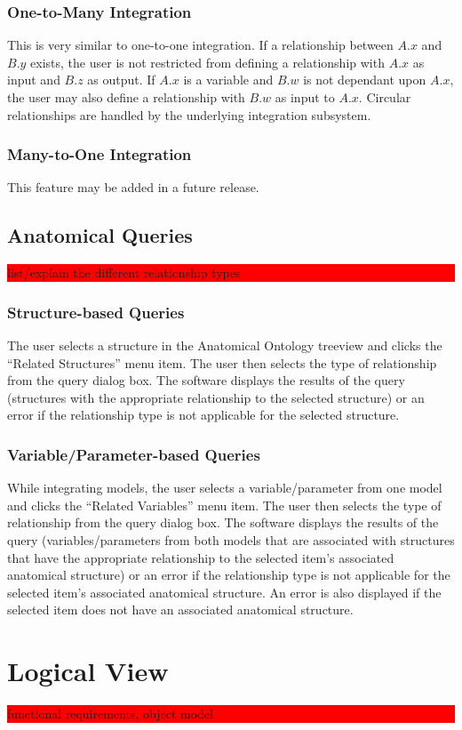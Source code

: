 \documentclass{article}
\newcommand{\todo}[1]{\colorbox{red}{\begin{minipage}{\textwidth}{#1}\end{minipage}}}
\begin{document}
\subsubsection{One-to-Many Integration}
This is very similar to one-to-one integration. If a relationship between $A.x$ and $B.y$ exists, the user is not restricted from defining a relationship with $A.x$ as input and $B.z$ as output. If $A.x$ is a variable and $B.w$ is not dependant upon $A.x$, the user may also define a relationship with $B.w$ as input to $A.x$. Circular relationships are handled by the underlying integration subsystem.
\subsubsection{Many-to-One Integration}
This feature may be added in a future release.
\subsection{Anatomical Queries}
\todo{list/explain the different relationship types}
\subsubsection{Structure-based Queries}
The user selects a structure in the Anatomical Ontology treeview and clicks the ``Related Structures'' menu item. The user then selects the type of relationship from the query dialog box. The software displays the results of the query (structures with the appropriate relationship to the selected structure) or an error if the relationship type is not applicable for the selected structure.
\subsubsection{Variable/Parameter-based Queries}
While integrating models, the user selects a variable/parameter from one model and clicks the ``Related Variables'' menu item. The user then selects the type of relationship from the query dialog box. The software displays the results of the query (variables/parameters from both models that are associated with structures that have the appropriate relationship to the selected item's associated anatomical structure) or an error if the relationship type is not applicable for the selected item's associated anatomical structure. An error is also displayed if the selected item does not have an associated anatomical structure.

\section{Logical View}
\todo{functional requirements, object model}
\end{document}

